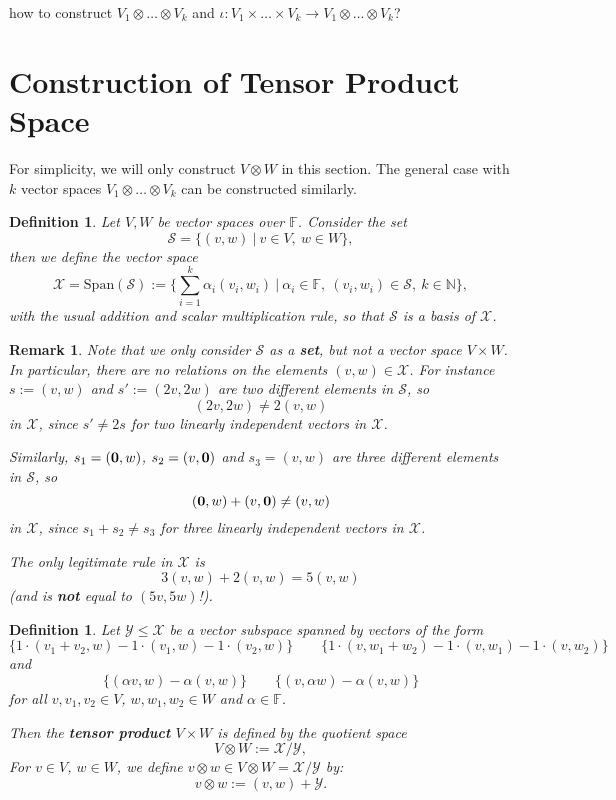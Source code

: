 \documentclass[12pt]{amsbook}
\newtheorem{definition}[theorem]{Definition}
\newtheorem{remark}[theorem]{Remark}
\begin{document}
\medskip
{} how to construct $V_1 \otimes \dots \otimes V_k$ and  $\iota: V_1 \times \dots \times V_k \to V_1 \otimes \dots \otimes V_k$?


\section{Construction of Tensor Product Space} 
For simplicity, we will only construct $V \otimes W$ in this section. The general case with $k$ vector spaces $V_1 \otimes \dots \otimes V_k$ can be constructed similarly.

\begin{definition} 
Let $V,W$ be vector spaces over $\mathbb{F}$. Consider the set
$$\mathcal{S} = \{(v,w)\ |\ v \in V,\ w \in W\},$$
then we define the vector space
$$\mathcal{X} = \mathrm{Span}(\mathcal{S}) := \{\sum_{i=1}^k \alpha_i(v_i,w_i)\ |\ \alpha_i \in \mathbb{F},\ (v_i,w_i) \in \mathcal{S},\ k \in \mathbb{N}\},$$ with the usual addition and scalar multiplication rule, so that $\mathcal{S}$ is a basis of $\mathcal{X}$.
\end{definition}

\begin{remark}
Note that we only consider $\mathcal{S}$ as a {\bf set}, but not a vector space $V \times W$. In particular, there are no relations on the elements $(v,w) \in \mathcal{X}$. For instance $s := (v,w)$ and $s' := (2v, 2w)$ are two different elements in $\mathcal{S}$, so
    $$(2v, 2w) \neq 2(v,w)$$
in $\mathcal{X}$, since $s' \neq 2s$ for two linearly independent vectors in $\mathcal{X}$.

Similarly, $s_1 = ({\bf 0}, w)$, $s_2 = (v,{\bf 0})$ and $s_3 = (v,w)$ are three different elements in $\mathcal{S}$, so
    $$({\bf 0}, w) + (v,{\bf 0}) \neq (v,w)$$
in $\mathcal{X}$, since $s_1 + s_2 \neq s_3$ for three linearly independent vectors in $\mathcal{X}$.  

The only legitimate rule in $\mathcal{X}$ is
    $$3(v,w) + 2(v,w) = 5(v,w)$$
    (and is {\bf not} equal to $(5v,5w)$!).
\end{remark}


\begin{definition} Let $\mathcal{Y} \leq \mathcal{X}$ be a vector subspace spanned by vectors of the form
$$\{1\cdot (v_1+v_2,w) - 1\cdot (v_1,w) - 1\cdot (v_2,w)\}\quad \quad \{1\cdot (v,w_1 + w_2) - 1\cdot (v,w_1) - 1\cdot (v,w_2)\}$$
and
$$\{(\alpha v,w) - \alpha (v,w)\} \quad \quad \{(v, \alpha w) - \alpha(v,w) \}$$
for all $v,v_1,v_2 \in V$, $w, w_1, w_2 \in W$ and $\alpha \in \mathbb{F}$. 

Then the {\bf tensor product} $V \times W$ is defined by 
the quotient space
$$V \otimes W := \mathcal{X}/\mathcal{Y},$$
For $v \in V$, $w \in W$, we define $v \otimes w \in V \otimes W = \mathcal{X}/\mathcal{Y}$ by:
$$v \otimes w := (v,w) + \mathcal{Y}.$$
\end{definition}
\end{document}
